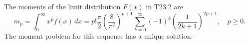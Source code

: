 The moments of the limit distribution \(F(x)\) in T23.2 are
\[
m_p = \int_0^{\infty} x^p f(x) \, dx = p! \frac{\pi}{2} \left(\frac{8}{\pi^2}\right)^{p+1} \sum_{k=0}^{\infty} (-1)^k \left(\frac{1}{2k+1}\right)^{2p+1}, \quad p \geq 0.
\]
The moment problem for this sequence has a unique solution.
